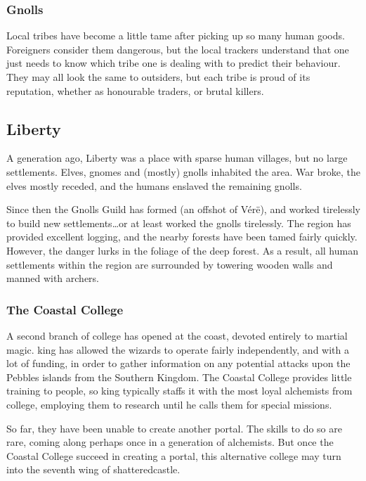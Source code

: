 \begin{multicols}{2}
\subsubsection{Gnolls}

Local tribes have become a little tame after picking up so many human goods.
Foreigners consider them dangerous, but the local trackers understand that one just needs to know which tribe one is dealing with to predict their behaviour.
They may all look the same to outsiders, but each tribe is proud of its reputation, whether as honourable traders, or brutal killers.

\subsection{Liberty}


A generation ago, Liberty was a place with sparse human villages, but no large settlements.
Elves, gnomes and (mostly) gnolls inhabited the area.
War broke, the elves mostly receded, and the humans enslaved the remaining gnolls.

Since then the Gnolls Guild has formed (an offshot of V\'er\"e), and worked tirelessly to build new settlements\ldots or at least worked the gnolls tirelessly.
The region has provided excellent logging, and the nearby forests have been tamed fairly quickly.
However, the danger lurks in the foliage of the deep forest.
As a result, all human settlements within the region are surrounded by towering wooden walls and manned with archers.

\subsubsection{The Coastal College}

A second branch of \gls{college} has opened at the coast, devoted entirely to martial magic.
\Gls{king} has allowed the wizards to operate fairly independently, and with a lot of funding, in order to gather information on any potential attacks upon the Pebbles islands from the Southern Kingdom.
The Coastal College provides little training to people, so \gls{king} typically staffs it with the most loyal alchemists from \gls{college}, employing them to research until he calls them for special missions.

So far, they have been unable to create another portal.
The skills to do so are rare, coming along perhaps once in a generation of alchemists.
But once the Coastal College succeed in creating a portal, this alternative college may turn into the seventh wing of \gls{shatteredcastle}.


\end{multicols}
